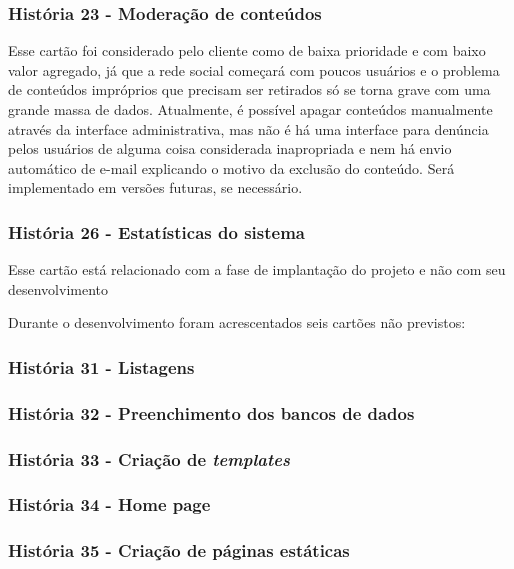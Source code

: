     \subsubsection{História 23 - Moderação de conteúdos}

      Esse cartão foi considerado pelo cliente como de baixa prioridade e com baixo valor agregado, já que a rede social começará com poucos usuários e o problema de conteúdos impróprios que precisam ser retirados só se torna grave com uma grande massa de dados. Atualmente, é possível apagar conteúdos manualmente através da interface administrativa, mas não é há uma interface para denúncia pelos usuários de alguma coisa considerada inapropriada e nem há envio automático de e-mail explicando o motivo da exclusão do conteúdo. Será implementado em versões futuras, se necessário.

    \subsubsection{História 26 - Estatísticas do sistema}

      Esse cartão está relacionado com a fase de implantação do projeto e não com seu desenvolvimento  

    Durante o desenvolvimento foram acrescentados seis cartões não previstos:

    \subsubsection{História 31 - Listagens}

    \subsubsection{História 32 - Preenchimento dos bancos de dados}

    \subsubsection{História 33 - Criação de \textit{templates}}

    \subsubsection{História 34 - Home page}

    \subsubsection{História 35 - Criação de páginas estáticas}

